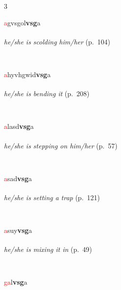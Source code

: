 \documentclass[oneside,openany]{book}%
\begin{document}
\noindent\begin{multicols}{3}%
\begin{minipage}[t]{\linewidth}
\raggedright\noindent \textcolor{Red}{a}gvsgol\textbf{vsg}a\\
\\
\noindent \textit{he/she is scolding him/her} (p.~104)
\end{minipage}\\[1em]%
\begin{minipage}[t]{\linewidth}
\raggedright\noindent \textcolor{Red}{a}hyvhgwid\textbf{vsg}a\\
\\
\noindent \textit{he/she is bending it} (p.~208)
\end{minipage}\\[1em]%
\begin{minipage}[t]{\linewidth}
\raggedright\noindent \textcolor{Red}{a}lasd\textbf{vsg}a\\
\\
\noindent \textit{he/she is stepping on him/her} (p.~57)
\end{minipage}\\[1em]%
\begin{minipage}[t]{\linewidth}
\raggedright\noindent \textcolor{Red}{a}sad\textbf{vsg}a\\
\\
\noindent \textit{he/she is setting a trap} (p.~121)
\end{minipage}\\[1em]%
\begin{minipage}[t]{\linewidth}
\raggedright\noindent \textcolor{Red}{a}suy\textbf{vsg}a\\
\\
\noindent \textit{he/she is mixing it in} (p.~49)
\end{minipage}\\[1em]%
\begin{minipage}[t]{\linewidth}
\raggedright\noindent \textcolor{Red}{ga}l\textbf{vsg}a\\
\\

\end{minipage}
\end{multicols}
\end{document}

